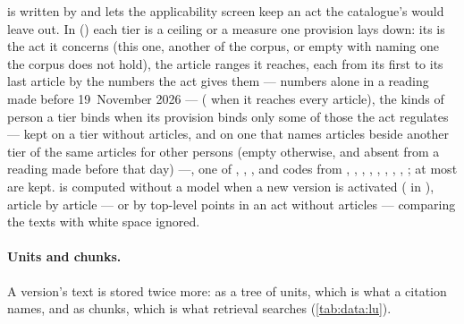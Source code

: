  is written by  and lets the applicability screen keep an act
the catalogue's  would leave out. In 
() each tier is a ceiling or a measure one provision lays down: its
 is the act it concerns (this one, another of the corpus, or empty with
 naming one the corpus does not hold),  the article ranges
it reaches, each from its first to its last article by the numbers the act gives them ---
numbers alone in a reading made before 19~November 2026 --- ( when it reaches every
article),  the kinds of person a tier binds when its provision binds only some
of those the act regulates --- kept on a tier without articles, and on one that names
articles beside another tier of the same articles for other persons (empty otherwise, and
absent from a reading made before that day) ---,  one of ,
, , and  codes from ,
, , , ,
, , , ; at most
 are kept.  is computed without a model when a new version
is activated ( in ), article by article --- or by
top-level points in an act without articles --- comparing the texts with white space ignored.

\paragraph{Units and chunks.} A version's text is stored twice more: as a tree of units, which
is what a citation names, and as chunks, which is what retrieval searches
(\cref{tab:data:lu}).

